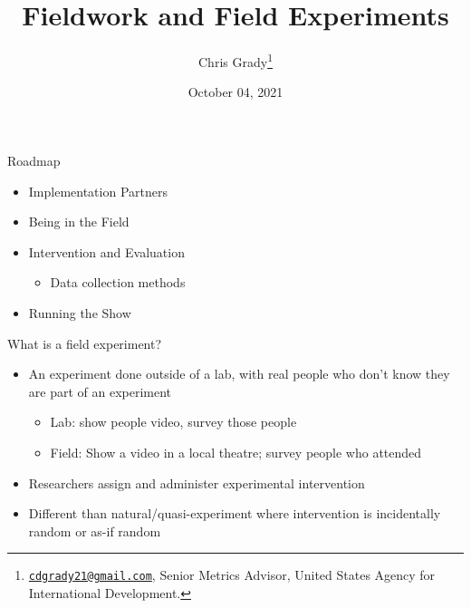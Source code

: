 \documentclass[11pt,ignorenonframetext,xcolor={svgnames}]{beamer}
\title[]{Fieldwork and Field Experiments}
\author{
Chris
Grady\thanks{\href{mailto:cdgrady21@gmail.com}{\nolinkurl{cdgrady21@gmail.com}},
Senior Metrics Advisor, United States Agency for International
Development.} \quad
}
\date{October 04, 2021}
\providecommand{\tightlist}{%
  \setlength{\itemsep}{0pt}\setlength{\parskip}{0pt}}
\begin{document}
\begin{frame}[plain,label=intro,noframenumbering]
\titlepage
\end{frame}


\begin{frame}
\end{frame}

\begin{frame}{Roadmap}
\protect\hypertarget{roadmap}{}
\begin{itemize}
\tightlist
\item
  Implementation Partners
\item
  Being in the Field
\item
  Intervention and Evaluation

  \begin{itemize}
  \tightlist
  \item
    Data collection methods
  \end{itemize}
\item
  Running the Show
\end{itemize}
\end{frame}

\begin{frame}{What is a field experiment?}
\protect\hypertarget{what-is-a-field-experiment}{}
\begin{itemize}
\tightlist
\item
  An experiment done outside of a lab, with real people who don't know
  they are part of an experiment

  \begin{itemize}
  \tightlist
  \item
    Lab: show people video, survey those people
  \item
    Field: Show a video in a local theatre; survey people who attended
  \end{itemize}
\item
  Researchers assign and administer experimental intervention
\end{itemize}

\smallskip

\begin{itemize}
\tightlist
\item
  Different than natural/quasi-experiment where intervention is
  incidentally random or as-if random
\end{itemize}
\end{frame}
\end{document}
